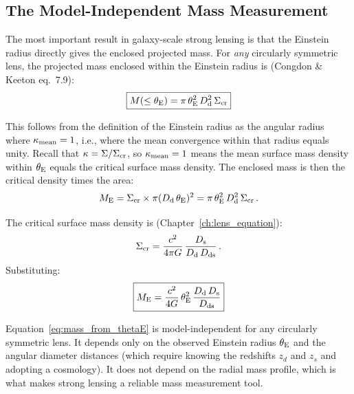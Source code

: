 \subsection{The Model-Independent Mass Measurement}

The most important result in galaxy-scale strong lensing is
that the Einstein radius directly gives the enclosed projected mass.
For \textit{any} circularly symmetric lens, the projected mass
enclosed within the Einstein radius is (Congdon \& Keeton
eq.~7.9):
\begin{equation}
    \boxed{
    M(\le \theta_{\mathrm{E}}) = \pi\,\theta_{\mathrm{E}}^2\,D_{\mathrm{d}}^2\,\Sigma_{\mathrm{cr}}
    }
    \label{eq:mass_einstein}
\end{equation}

This follows from the definition of the Einstein radius as the
angular radius where $\kappa_{\mathrm{mean}} = 1$, i.e., where
the mean convergence within that radius equals unity.  Recall that
$\kappa = \Sigma/\Sigma_{\mathrm{cr}}$, so $\kappa_{\mathrm{mean}} = 1$
means the mean surface mass density within $\theta_{\mathrm{E}}$ equals the
critical surface mass density.  The enclosed mass is then the
critical density times the area:
\begin{equation}
    M_{\mathrm{E}} = \Sigma_{\mathrm{cr}} \times \pi (D_{\mathrm{d}}\,\theta_{\mathrm{E}})^2
    = \pi\,\theta_{\mathrm{E}}^2\,D_{\mathrm{d}}^2\,\Sigma_{\mathrm{cr}} \,.
    \label{eq:mass_einstein_derivation}
\end{equation}

The critical surface mass density is
(Chapter~\ref{ch:lens_equation}):
\begin{equation}
    \Sigma_{\mathrm{cr}} = \frac{c^2}{4\pi G}
    \,\frac{D_{\mathrm{s}}}{D_{\mathrm{d}}\,D_{\mathrm{ds}}} \,.
    \label{eq:sigma_cr_recap}
\end{equation}
Substituting:
\begin{equation}
    \boxed{
    M_{\mathrm{E}} = \frac{c^2}{4G}
    \,\theta_{\mathrm{E}}^2\,\frac{D_{\mathrm{d}}\,D_{\mathrm{s}}}{D_{\mathrm{ds}}}
    }
    \label{eq:mass_from_thetaE}
\end{equation}

\begin{remark}
Equation~\eqref{eq:mass_from_thetaE} is model-independent
for any circularly symmetric lens.  It depends only on the observed
Einstein radius $\theta_{\mathrm{E}}$ and the angular diameter distances
(which require knowing the redshifts $z_d$ and $z_s$ and adopting
a cosmology).  It does not depend on the radial mass profile, which
is what makes strong lensing a reliable mass measurement tool.
\end{remark}

